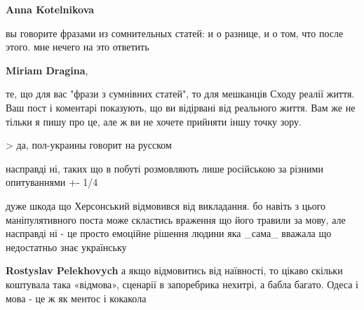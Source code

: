 \begin{itemize}
\begin{itemize}
\textbf{Anna Kotelnikova} 

вы говорите фразами из сомнительных статей: и о разнице, и о том, что после этого. мне нечего на это ответить

 
\textbf{Miriam Dragina}, 

те, що для вас "фрази з сумнівних статей", то для мешканців Сходу реалії життя.
Ваш пост і коментарі показують, що ви відірвані від реального життя. Вам же не
тільки я пишу про це, але ж ви не хочете прийняти іншу точку зору.

\end{itemize}

 
> да, пол-украины говорит на русском

насправді ні, таких що в побуті розмовляють лише російською за різними
опитуваннями +- 1/4

дуже шкода що Херсонський відмовився від викладання. бо навіть з цього
маніпулятивного поста може скластись враження що його травили за мову, але
насправді ні - це просто емоційне рішення людини яка \_сама\_ вважала що
недостатньо знає українську

\begin{itemize}
 
\textbf{Rostyslav Pelekhovych} а якщо відмовитись від наївності, то цікаво скільки коштувала така «відмова», сценарії в запоребрика нехитрі, а бабла багато. Одеса і мова - це ж як ментос і кокакола

 

\end{itemize}
\end{itemize}
